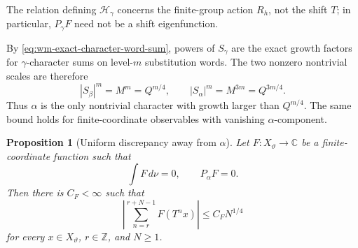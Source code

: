 \documentclass[11pt,reqno,a4paper]{amsart}
\numberwithin{equation}{section}
\theoremstyle{compact}
\newtheorem{proposition}[proposition]{Proposition}
\theoremstyle{definition}
\theoremstyle{definition}
\begin{document}
The relation defining $\mathcal H_\gamma$ concerns the finite-group action
$R_h$, not the shift $T$; in particular, $P_\gamma F$ need not be a shift
eigenfunction.

By \eqref{eq:wm-exact-character-word-sum}, powers of $S_\gamma$ are
the exact growth factors for $\gamma$-character sums on level-$m$
substitution words.  The two nonzero nontrivial scales are therefore
\begin{equation}\label{eq:wm-scale-reminder}
  |S_\beta|^m=M^m=Q^{m/4},
  \qquad
  |S_\alpha|^m=M^{3m}=Q^{3m/4}.
\end{equation}
Thus $\alpha$ is the only nontrivial character with growth larger than
$Q^{m/4}$.  The same bound holds for finite-coordinate observables with
vanishing $\alpha$-component.

\begin{proposition}[Uniform discrepancy away from $\alpha$]
\label{prop:wm-symbolic-discrepancy}
Let $F:X_\vartheta\to\mathbb C$ be a finite-coordinate function such that
\begin{equation}\label{eq:wm-discrepancy-hypotheses}
  \int F\,d\nu=0,
  \qquad
  P_\alpha F=0.
\end{equation}
Then there is $C_F<\infty$ such that
\begin{equation}\label{eq:wm-arbitrary-interval-discrepancy}
  \left|
    \sum_{n=r}^{r+N-1}F(T^nx)
  \right|
  \leq C_FN^{1/4}
\end{equation}
for every $x\in X_\vartheta$, $r\in\mathbb Z$, and $N\geq1$.
\end{proposition}
\end{document}

